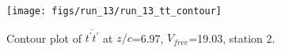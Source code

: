 \begin{figure}[H]
\centering
\texttt{[image: figs/run\_13/run\_13\_tt\_contour]}
\caption{Contour plot of $\overline{t^\prime t^\prime}$ at $z/c$=6.97, $V_{free}$=19.03, station 2.}
\label{fig:run_13_tt_contour}
\end{figure}


